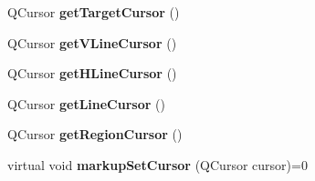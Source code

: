 \begin{DoxyCompactItemize}
\item 
\hypertarget{classimageMarkup_af58bcc05af6b1833034e1a5de0de420f}{
QCursor {\bfseries getTargetCursor} ()}
\label{classimageMarkup_af58bcc05af6b1833034e1a5de0de420f}

\item 
\hypertarget{classimageMarkup_a9f24e2d4fa21e06a0b0992738d0fa0d3}{
QCursor {\bfseries getVLineCursor} ()}
\label{classimageMarkup_a9f24e2d4fa21e06a0b0992738d0fa0d3}

\item 
\hypertarget{classimageMarkup_abef73b9a243d9c1af8d1a218d3cdbd7a}{
QCursor {\bfseries getHLineCursor} ()}
\label{classimageMarkup_abef73b9a243d9c1af8d1a218d3cdbd7a}

\item 
\hypertarget{classimageMarkup_a9ee9d8beac075524f79fd3814067e1da}{
QCursor {\bfseries getLineCursor} ()}
\label{classimageMarkup_a9ee9d8beac075524f79fd3814067e1da}

\item 
\hypertarget{classimageMarkup_a3c8cb649388cc91c10abd6f085ced249}{
QCursor {\bfseries getRegionCursor} ()}
\label{classimageMarkup_a3c8cb649388cc91c10abd6f085ced249}

\item 
\hypertarget{classimageMarkup_aa3e259930011166fcf12df66b86aa6c9}{
virtual void {\bfseries markupSetCursor} (QCursor cursor)=0}
\label{classimageMarkup_aa3e259930011166fcf12df66b86aa6c9}

\end{DoxyCompactItemize}
